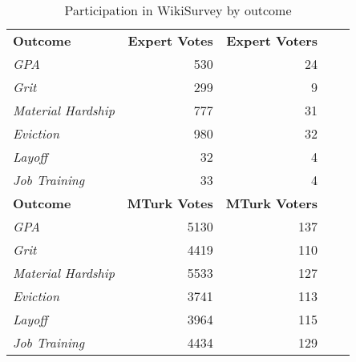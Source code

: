 \begin{table}[h]
\centering
\caption{Participation in WikiSurvey by outcome}
\label{wikisurvey}
\begin{tabular}{l|rrrr}
\toprule
\textbf{Outcome}           & \textbf{Expert Votes} & \textbf{Expert Voters} \\
\textit{GPA}               & 530                   & 24                     \\
\textit{Grit}              & 299                   & 9                      \\
\textit{Material Hardship} & 777                   & 31                     \\
\textit{Eviction}          & 980                   & 32                     \\
\textit{Layoff}            & 32                    & 4                      \\
\textit{Job Training}      & 33                    & 4                      \\
\midrule
\textbf{Outcome}           & \textbf{MTurk Votes}  & \textbf{MTurk Voters}  \\
\textit{GPA}               & 5130                  & 137                    \\
\textit{Grit}              & 4419                  & 110                    \\
\textit{Material Hardship} & 5533                  & 127                    \\
\textit{Eviction}          & 3741                  & 113                    \\
\textit{Layoff}            & 3964                  & 115                    \\
\textit{Job Training}      & 4434                  & 129                    \\
\bottomrule
\end{tabular}
\end{table}



